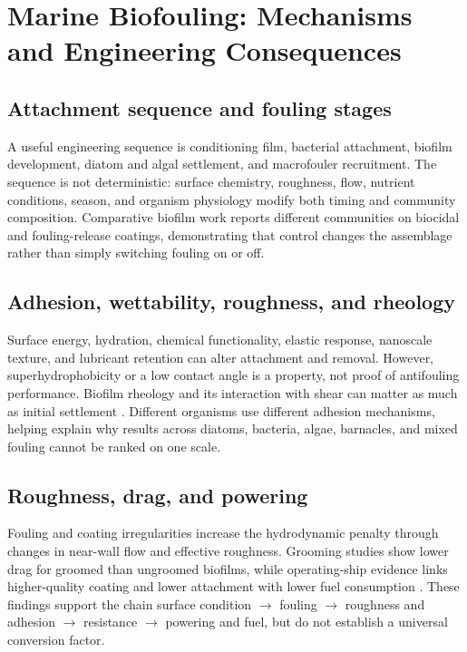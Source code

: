 \section{Marine Biofouling: Mechanisms and Engineering Consequences}
\subsection{Attachment sequence and fouling stages}
A useful engineering sequence is conditioning film, bacterial attachment, biofilm development, diatom and algal settlement, and macrofouler recruitment. The sequence is not deterministic: surface chemistry, roughness, flow, nutrient conditions, season, and organism physiology modify both timing and community composition. Comparative biofilm work reports different communities on biocidal and fouling-release coatings, demonstrating that control changes the assemblage rather than simply switching fouling on or off.

\subsection{Adhesion, wettability, roughness, and rheology}
Surface energy, hydration, chemical functionality, elastic response, nanoscale texture, and lubricant retention can alter attachment and removal. However, superhydrophobicity or a low contact angle is a property, not proof of antifouling performance. Biofilm rheology and its interaction with shear can matter as much as initial settlement \cite{snowdon_surface_2023}. Different organisms use different adhesion mechanisms, helping explain why results across diatoms, bacteria, algae, barnacles, and mixed fouling cannot be ranked on one scale.

\subsection{Roughness, drag, and powering}
Fouling and coating irregularities increase the hydrodynamic penalty through changes in near-wall flow and effective roughness. Grooming studies show lower drag for groomed than ungroomed biofilms, while operating-ship evidence links higher-quality coating and lower attachment with lower fuel consumption \cite{hearin_analysis_2016,hunsucker_biofilm_2018,hakim_investigation_2019}. These findings support the chain surface condition $\rightarrow$ fouling $\rightarrow$ roughness and adhesion $\rightarrow$ resistance $\rightarrow$ powering and fuel, but do not establish a universal conversion factor.

